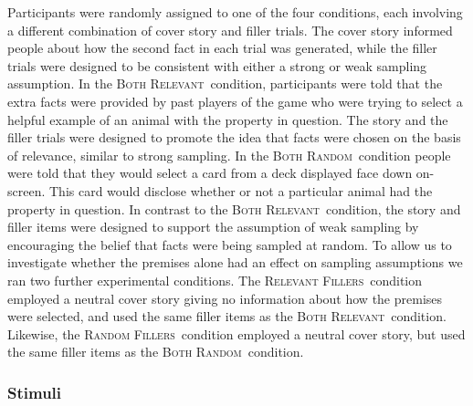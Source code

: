 \documentclass[doc,12pt]{apa}
\newcommand{\relevant}{\textsc{Both Relevant}}
\newcommand{\relevantdata}{\textsc{Relevant Fillers}}
\newcommand{\randomdata}{\textsc{Random Fillers}}
\newcommand{\random}{\textsc{Both Random}}
\begin{document}
Participants were randomly assigned to one of the four conditions, each involving a different combination of cover story and filler trials. The cover story informed people about how the second fact in each trial was generated, while the filler trials were designed to be consistent with either a strong or weak sampling assumption. In the \relevant\ condition, participants were told that the extra facts were provided by past players of the game who were trying to select a helpful example of an animal with the property in question. The story and the filler trials were designed to promote the idea that facts were chosen on the basis of relevance, similar to strong sampling. In the \random\ condition people were told that they would select a card from a deck displayed face down on-screen. This card would disclose whether or not a particular animal had the property in question. In contrast to the \relevant\ condition, the story and filler items were designed to support the assumption of weak sampling by encouraging the belief that facts were being sampled at random. To allow us to investigate whether the premises alone had an effect on sampling assumptions we ran two further experimental conditions.  The \relevantdata\ condition employed a neutral cover story giving no information about how the premises were selected, and used the same filler items as the \relevant\ condition. Likewise, the \randomdata\ condition employed a neutral cover story, but used the same filler items as the \random\ condition.

\subsubsection{Stimuli}
\end{document}
